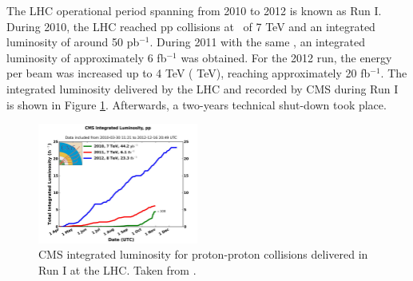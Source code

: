 The LHC operational period spanning from 2010 to 2012 is known as Run I. During 2010, the LHC 
reached pp collisions at \centermassenergy~of 7 TeV and an integrated luminosity of around 
50 pb$^{-1}$. During 2011 with the same \centermassenergy, an integrated luminosity of approximately 
6 fb$^{-1}$ was obtained. For the 2012 run, the energy per beam was increased 
up to 4 TeV ( TeV), reaching approximately 20 fb$^{-1}$. The integrated luminosity delivered 
by the LHC and recorded by CMS during Run I is shown in Figure \ref{figchp2:luminosityRunI}. Afterwards, a two-years
technical shut-down took place. \\

\begin{figure}[ht]
    \begin{center}
      \includegraphics[width=0.47\textwidth]{figuras/Chapter2/CMSluminosityRunI.jpg}
      \caption{CMS integrated luminosity for proton-proton collisions delivered
      in Run I at the LHC. Taken from \cite{chp2:LHCluminosity}.}
     \label{figchp2:luminosityRunI}
    \end{center}
\end{figure}

